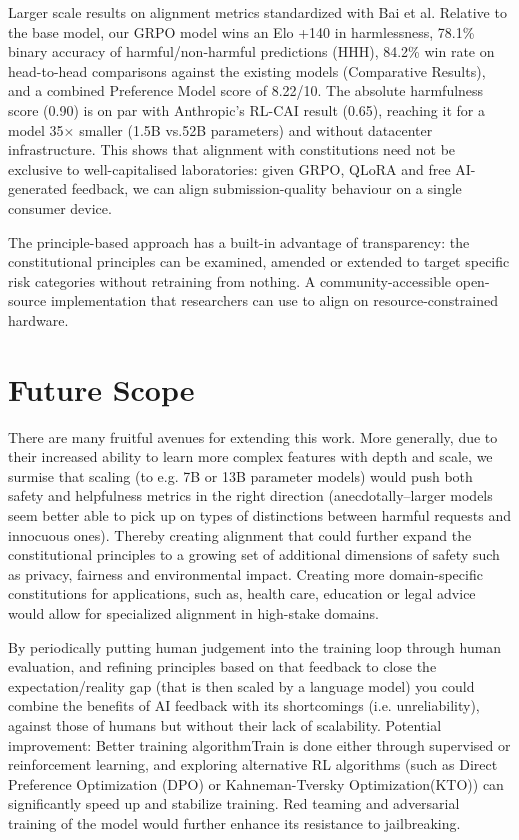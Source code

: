 \documentclass[conference]{IEEEtran}
\begin{document}
Larger scale results on alignment metrics standardized with Bai et al. Relative to the base model, our GRPO model wins an Elo +140 in harmlessness, 78.1\% binary accuracy of harmful/non-harmful predictions (HHH), 84.2\% win rate on head-to-head comparisons against the existing models (Comparative Results), and a combined Preference Model score of 8.22/10\cite{bai2022constitutional}. The absolute harmfulness score (0.90) is on par with Anthropic's RL-CAI result (0.65), reaching it for a model 35$\times$ smaller (1.5B vs.52B parameters) and without datacenter infrastructure. This shows that alignment with constitutions need not be exclusive to well-capitalised laboratories: given GRPO, QLoRA and free AI-generated feedback, we can align submission-quality behaviour on a single consumer device.

The principle-based approach has a built-in advantage of transparency: the constitutional principles can be examined, amended or extended to target specific risk categories without retraining from nothing. A community-accessible open-source implementation that researchers can use to align on resource-constrained hardware.


\section{Future Scope}

There are many fruitful avenues for extending this work. More generally, due to their increased ability to learn more complex features with depth and scale, we surmise that scaling (to e.g. 7B or 13B parameter models) would push both safety and helpfulness metrics in the right direction (anecdotally–larger models seem better able to pick up on types of distinctions between harmful requests and innocuous ones). Thereby creating alignment that could further expand the constitutional principles to a growing set of additional dimensions of safety such as privacy, fairness and environmental impact. Creating more domain-specific constitutions for applications, such as, health care, education or legal advice would allow for specialized alignment in high-stake domains.

By periodically putting human judgement into the training loop through human evaluation, and refining principles based on that feedback to close the expectation/reality gap (that is then scaled by a language model) you could combine the benefits of AI feedback with its shortcomings (i.e. unreliability), against those of humans but without their lack of scalability. Potential improvement: Better training algorithmTrain is done either through supervised or reinforcement learning, and exploring alternative RL algorithms (such as Direct Preference Optimization (DPO) or Kahneman-Tversky Optimization(KTO)) can significantly speed up and stabilize training. Red teaming and adversarial training of the model would further enhance its resistance to jailbreaking.
\end{document}
